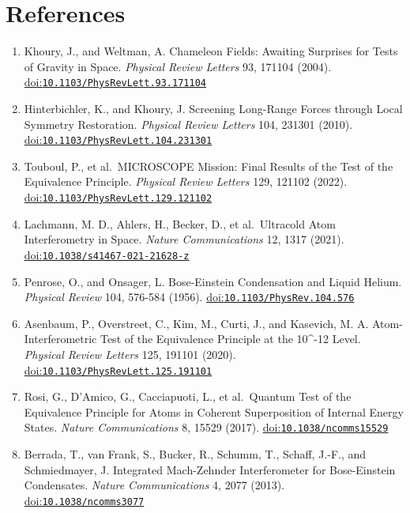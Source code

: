 \documentclass[
  american,
  11pt,
  letterpaper,
]{article}
\providecommand{\tightlist}{%
  \setlength{\itemsep}{0pt}\setlength{\parskip}{0pt}}
\begin{document}
\section{References}\label{references}

\begin{enumerate}
\def\labelenumi{\arabic{enumi}.}
\tightlist
\item
  Khoury, J., and Weltman, A. Chameleon Fields: Awaiting Surprises for Tests of Gravity in Space. \emph{Physical Review Letters} 93, 171104 (2004). \href{https://doi.org/10.1103/PhysRevLett.93.171104}{doi:\nolinkurl{10.1103/PhysRevLett.93.171104}}
\item
  Hinterbichler, K., and Khoury, J. Screening Long-Range Forces through Local Symmetry Restoration. \emph{Physical Review Letters} 104, 231301 (2010). \href{https://doi.org/10.1103/PhysRevLett.104.231301}{doi:\nolinkurl{10.1103/PhysRevLett.104.231301}}
\item
  Touboul, P., et al.~MICROSCOPE Mission: Final Results of the Test of the Equivalence Principle. \emph{Physical Review Letters} 129, 121102 (2022). \href{https://doi.org/10.1103/PhysRevLett.129.121102}{doi:\nolinkurl{10.1103/PhysRevLett.129.121102}}
\item
  Lachmann, M. D., Ahlers, H., Becker, D., et al.~Ultracold Atom Interferometry in Space. \emph{Nature Communications} 12, 1317 (2021). \href{https://doi.org/10.1038/s41467-021-21628-z}{doi:\nolinkurl{10.1038/s41467-021-21628-z}}
\item
  Penrose, O., and Onsager, L. Bose-Einstein Condensation and Liquid Helium. \emph{Physical Review} 104, 576-584 (1956). \href{https://doi.org/10.1103/PhysRev.104.576}{doi:\nolinkurl{10.1103/PhysRev.104.576}}
\item
  Asenbaum, P., Overstreet, C., Kim, M., Curti, J., and Kasevich, M. A. Atom-Interferometric Test of the Equivalence Principle at the 10\^{}-12 Level. \emph{Physical Review Letters} 125, 191101 (2020). \href{https://doi.org/10.1103/PhysRevLett.125.191101}{doi:\nolinkurl{10.1103/PhysRevLett.125.191101}}
\item
  Rosi, G., D'Amico, G., Cacciapuoti, L., et al.~Quantum Test of the Equivalence Principle for Atoms in Coherent Superposition of Internal Energy States. \emph{Nature Communications} 8, 15529 (2017). \href{https://doi.org/10.1038/ncomms15529}{doi:\nolinkurl{10.1038/ncomms15529}}
\item
  Berrada, T., van Frank, S., Bucker, R., Schumm, T., Schaff, J.-F., and Schmiedmayer, J. Integrated Mach-Zehnder Interferometer for Bose-Einstein Condensates. \emph{Nature Communications} 4, 2077 (2013). \href{https://doi.org/10.1038/ncomms3077}{doi:\nolinkurl{10.1038/ncomms3077}}

\end{enumerate}
\end{document}
